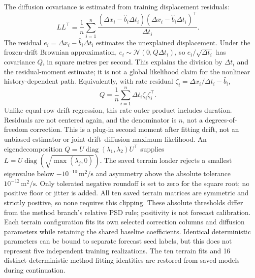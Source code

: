 \documentclass[11pt]{article}
\begin{document}
The diffusion covariance is estimated from training displacement residuals:
\begin{equation}
 LL^\top=\frac{1}{n}\sum_{i=1}^n
 \frac{(\Delta x_i-\widehat b_i\Delta t_i)
       (\Delta x_i-\widehat b_i\Delta t_i)^\top}{\Delta t_i}.
 \label{eq:diffusion}
\end{equation}
The residual \(e_i=\Delta x_i-\widehat b_i\Delta t_i\) estimates the
unexplained displacement. Under the frozen-drift Brownian approximation,
\(e_i\sim\mathcal N(0,Q\Delta t_i)\), so
\(e_i/\sqrt{\Delta t_i}\) has covariance \(Q\), in square metres per second.
This explains the division by \(\Delta t_i\) and the residual-moment estimate;
it is not a global likelihood claim for the nonlinear history-dependent path.
Equivalently, with rate residual
\(\zeta_i=\Delta x_i/\Delta t_i-\widehat b_i\),
\begin{equation}
 Q=\frac1n\sum_{i=1}^n\Delta t_i\zeta_i\zeta_i^\top.
 \label{eq:terrain-rate-Q}
\end{equation}
Unlike equal-row drift regression, this rate outer product includes duration.
Residuals are not centered again, and the denominator is \(n\), not a
degrees-of-freedom correction. This is a plug-in second moment after fitting
drift, not an unbiased estimator or joint drift--diffusion maximum likelihood.
An eigendecomposition \(Q=U\operatorname{diag}(\lambda_1,\lambda_2)U^\top\)
supplies \(L=U\operatorname{diag}(\sqrt{\max(\lambda_j,0)})\).
The saved terrain loader rejects a smallest eigenvalue below
\(-10^{-10}\,\mathrm{m}^2/\mathrm{s}\) and asymmetry above the absolute
tolerance \(10^{-12}\,\mathrm{m}^2/\mathrm{s}\). Only tolerated negative
roundoff is set to zero for the square root; no positive floor or jitter is
added. All ten saved terrain matrices are symmetric and strictly positive,
so none requires this clipping. These absolute thresholds differ from the
method branch's relative PSD rule; positivity is not forecast calibration.
Each terrain configuration fits its own selected correction columns and
diffusion parameters while retaining the shared baseline coefficients.
Identical deterministic parameters can be bound to separate forecast seed
labels, but this does not represent five independent training realizations.
The ten terrain fits and 16 distinct deterministic method fitting identities
are restored from saved models during continuation.
\end{document}
